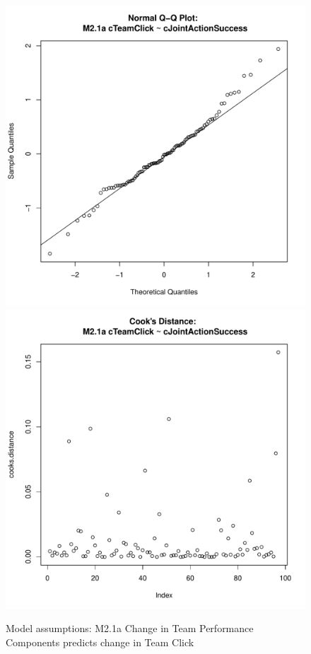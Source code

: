 \begin{figure}[htbp]
   \includegraphics[scale =.4]{images/MLM21aQQNorm.pdf}
   \includegraphics[scale =.4]{images/MLM21aCooksD.pdf}
   \caption{Model assumptions: M2.1a Change in Team Performance Components predicts change in Team Click}
   \label{fig:MLM21aAssumptions}
 \end{figure}



